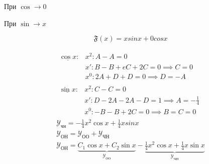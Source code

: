 \pagebreak

При $\cos \longrightarrow  0$

При $\sin \longrightarrow x $ 

\[
\mathfrak{F}(x) =xsinx+0cosx
\]
 
\begin{gather}
    \begin{aligned}
        \underline{\cos x}: &x^2 : A-A = 0 \\
        &x' : B-B+eC+2C = 0 \implies C = 0 \\
        &x^0 : 2A + D + D = 0 \implies D = -A
    \end{aligned} \\
    \begin{aligned}
        \underline{\sin x}: &x^2 : C-C = 0 \\
        &x' : D - 2A - 2A - D = 1 \implies A = - \frac{1}{4} \\
        &x^0 : -B -B + 2C = 0 \implies B = C = 0
    \end{aligned} \\
    \boxed{\mathcal{Y}_{\text{чн}} = - \frac{1}{4}x^2 \cos x + \frac{1}{4} x sin x} \\
    \mathcal{Y}_{\text{ОН}} = \mathcal{Y}_{\text{ОО}} + \mathcal{Y}_{\text{ЧН}} \\
    \boxed{\mathcal{Y}_{\text{ОН}} = \underbrace{C_1 \cos x + C_2 \sin x}_{\mathcal{Y}_{\text{ОО}}} -
        \underbrace{\frac{1}{4} x^2 \cos x + \frac{1}{4} x \sin x}_{\mathcal{Y}_{\text{ЧН}}}}
\end{gather}

